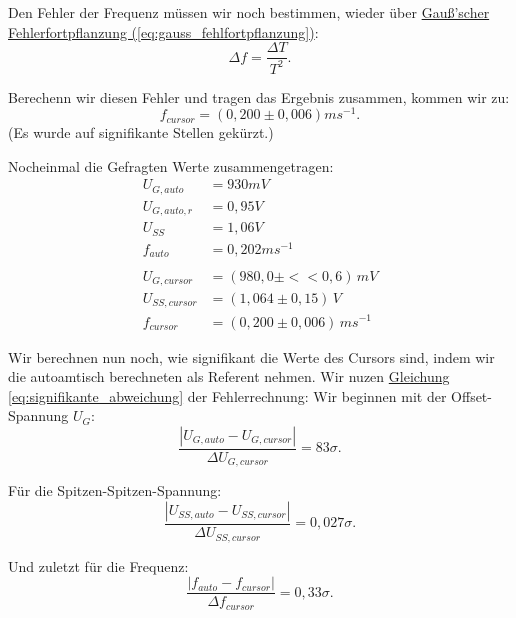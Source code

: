 Den Fehler der Frequenz müssen wir noch bestimmen, wieder über \hyperref[eq:gauss_fehlfortpflanzung]{Gauß'scher Fehlerfortpflanzung (\ref*{eq:gauss_fehlfortpflanzung})}:
\begin{equation}
    \Delta f = \frac{\Delta T}{T^2}.
\end{equation}

Berechenn wir diesen Fehler und tragen das Ergebnis zusammen, kommen wir zu: 
\begin{equation}
    \boxed{
        f_{cursor} = (0,200 \pm 0,006) ms^{-1}
    }.
\end{equation}
(Es wurde auf signifikante Stellen gekürzt.)


Nocheinmal die Gefragten Werte zusammengetragen:
\begin{align*}
    U_{G,auto} &= 930 mV \\
    U_{G,auto,r} &= 0,95 V \\
    U_{SS} &= 1,06 V \\
    f_{auto} &= 0,202 ms^{-1} \\
    \\
    U_{G,cursor}& = (980,0 \pm<< 0,6)\, mV \\
    U_{SS,cursor} &= (1,064 \pm 0,15)\, V \\
    f_{cursor} &= (0,200 \pm 0,006)\, ms^{-1}
\end{align*}

Wir berechnen nun noch, wie signifikant die Werte des Cursors sind, indem wir die autoamtisch berechneten als Referent nehmen. Wir nuzen \hyperref[eq:signifikante_abweichung]{Gleichung \ref*{eq:signifikante_abweichung}} der Fehlerrechnung:
Wir beginnen mit der Offset-Spannung $U_G$:
\begin{equation}
    \frac{\left| U_{G,auto} - U_{G,cursor} \right|}{\Delta U_{G,cursor}} = 83\sigma.
\end{equation}

Für die Spitzen-Spitzen-Spannung:
\begin{equation}
    \frac{\left| U_{SS,auto} - U_{SS,cursor} \right|}{\Delta U_{SS,cursor}} = 0,027\sigma.
\end{equation}

Und zuletzt für die Frequenz:
\begin{equation}
    \frac{\left| f_{auto} - f_{cursor} \right|}{\Delta f_{cursor}} = 0,33\sigma.
\end{equation}




